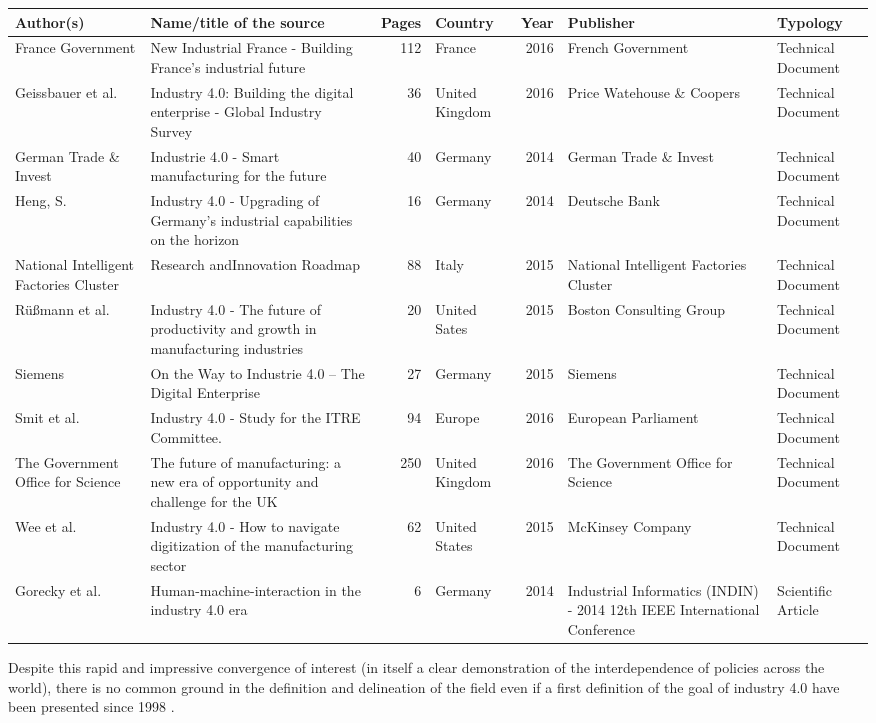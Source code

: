 \documentclass[]{book}
\begin{document}
\begin{tabular}{l|l|r|l|r|l|l}
\hline
Author(s) & Name/title of the source & Pages & Country & Year & Publisher & Typology\\
\hline
France Government & New Industrial France - Building France’s industrial future & 112 & France & 2016 & French Government & Technical Document\\
\hline
Geissbauer et al. & Industry 4.0: Building the digital enterprise - Global Industry Survey & 36 & United Kingdom & 2016 & Price Watehouse \& Coopers & Technical Document\\
\hline
German Trade \& Invest & Industrie 4.0 - Smart manufacturing for the future & 40 & Germany & 2014 & German Trade \& Invest & Technical Document\\
\hline
Heng, S. & Industry 4.0 - Upgrading of Germany’s industrial capabilities on the horizon & 16 & Germany & 2014 & Deutsche Bank & Technical Document\\
\hline
National Intelligent Factories Cluster & Research andInnovation Roadmap & 88 & Italy & 2015 & National Intelligent Factories Cluster & Technical Document\\
\hline
Rüßmann et al. & Industry 4.0 - The future of productivity and growth in manufacturing industries & 20 & United Sates & 2015 & Boston Consulting Group & Technical Document\\
\hline
Siemens & On the Way to Industrie 4.0 – The Digital Enterprise & 27 & Germany & 2015 & Siemens & Technical Document\\
\hline
Smit et al. & Industry 4.0 - Study for the ITRE Committee. & 94 & Europe & 2016 & European Parliament & Technical Document\\
\hline
The Government Office for Science & The future of manufacturing: a new era of opportunity and challenge for the UK & 250 & United Kingdom & 2016 & The Government Office for Science & Technical Document\\
\hline
Wee et al. & Industry 4.0 - How to navigate digitization of the manufacturing sector & 62 & United States & 2015 & McKinsey Company & Technical Document\\
\hline
Gorecky et al. & Human-machine-interaction in the industry 4.0 era & 6 & Germany & 2014 & Industrial Informatics (INDIN) - 2014 12th IEEE International Conference & Scientific Article\\
\hline
\end{tabular}

Despite this rapid and impressive convergence of interest (in itself a
clear demonstration of the interdependence of policies across the
world), there is no common ground in the definition and delineation of
the field even if a first definition of the goal of industry 4.0 have
been presented since 1998 \citep{national1998visionary}.
\end{document}

